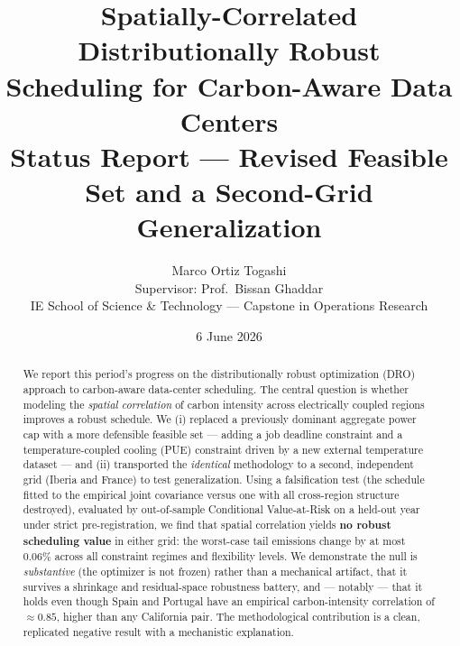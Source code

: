 \documentclass[11pt]{article}
\title{\vspace{-2.2em}\textbf{\color{navy} Spatially-Correlated Distributionally Robust\\[2pt]
Scheduling for Carbon-Aware Data Centers}\\[6pt]
\large\color{gold} Status Report --- Revised Feasible Set and a Second-Grid Generalization}
\author{Marco Ortiz Togashi \\ \small Supervisor: Prof.\ Bissan Ghaddar \\
\small IE School of Science \& Technology --- Capstone in Operations Research}
\date{6 June 2026}
\begin{document}
\maketitle
\thispagestyle{empty}

\begin{abstract}
\noindent We report this period's progress on the distributionally robust optimization (DRO) approach
to carbon-aware data-center scheduling. The central question is whether modeling the \emph{spatial
correlation} of carbon intensity across electrically coupled regions improves a robust schedule. We
(i) replaced a previously dominant aggregate power cap with a more defensible feasible set --- adding a
job deadline constraint and a temperature-coupled cooling (PUE) constraint driven by a new external
temperature dataset --- and (ii) transported the \emph{identical} methodology to a second, independent
grid (Iberia and France) to test generalization. Using a falsification test (the schedule fitted to
the empirical joint covariance versus one with all cross-region structure destroyed), evaluated by
out-of-sample Conditional Value-at-Risk on a held-out year under strict pre-registration, we find that
spatial correlation yields \textbf{no robust scheduling value} in either grid: the worst-case tail
emissions change by at most $0.06\%$ across all constraint regimes and flexibility levels. We
demonstrate the null is \emph{substantive} (the optimizer is not frozen) rather than a mechanical
artifact, that it survives a shrinkage and residual-space robustness battery, and --- notably --- that
it holds even though Spain and Portugal have an empirical carbon-intensity correlation of $\approx
0.85$, higher than any California pair. The methodological contribution is a clean, replicated negative
result with a mechanistic explanation.
\end{abstract}
\end{document}
